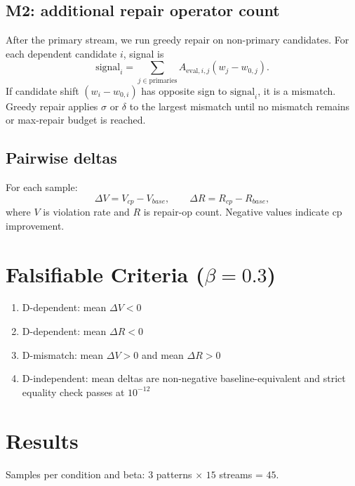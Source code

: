 \documentclass[11pt,a4paper]{article}
\begin{document}
\subsection{M2: additional repair operator count}
After the primary stream, we run greedy repair on non-primary candidates.
For each dependent candidate \(i\), signal is
\[
\text{signal}_i = \sum_{j\in\text{primaries}} A_{\text{eval},i,j}(w_j-w_{0,j}).
\]
If candidate shift \((w_i-w_{0,i})\) has opposite sign to \(\text{signal}_i\), it is a mismatch.
Greedy repair applies \(\sigma\) or \(\delta\) to the largest mismatch until no mismatch remains or max-repair budget is reached.

\subsection{Pairwise deltas}
For each sample:
\[
\Delta V = V_{cp} - V_{base},\qquad
\Delta R = R_{cp} - R_{base},
\]
where \(V\) is violation rate and \(R\) is repair-op count.
Negative values indicate cp improvement.

\section{Falsifiable Criteria (\(\beta=0.3\))}
\begin{enumerate}
  \item D-dependent: mean \(\Delta V < 0\)
  \item D-dependent: mean \(\Delta R < 0\)
  \item D-mismatch: mean \(\Delta V > 0\) and mean \(\Delta R > 0\)
  \item D-independent: mean deltas are non-negative baseline-equivalent and strict equality check passes at \(10^{-12}\)
\end{enumerate}

\section{Results}
Samples per condition and beta: \(3\) patterns \(\times\) \(15\) streams = \(45\).
\end{document}
